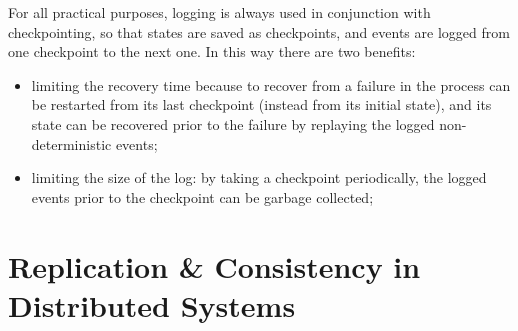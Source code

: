 \documentclass[11pt, a4paper]{article}
\begin{document}
\emptyln{}
For all practical purposes, logging is always used in conjunction with checkpointing, so that states are saved as checkpoints, and events are logged from one checkpoint to the next one.
In this way there are two benefits:
\begin{itemize}
    \item limiting the recovery time because to recover from a failure in the process can be restarted from its last checkpoint (instead from its initial state), and its state can be recovered prior to the failure by replaying the logged non-deterministic events;
    \item limiting the size of the log: by taking a checkpoint periodically, the logged events prior to the checkpoint can be garbage collected;
\end{itemize}
%
%
\section{Replication \& Consistency in Distributed Systems}\label{sec:replication_consistency_in_distributed_systems} %
%
\end{document}
